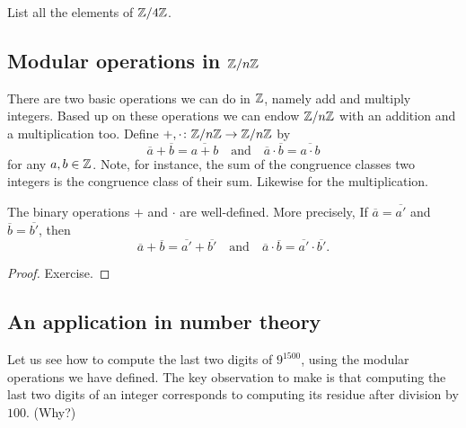 \documentclass[11pt,a4paper]{article}
\begin{document}
\begin{eje}
    List all the elements of \(\mathbb{Z}/ 4 \mathbb{Z}\).
\end{eje}


\subsection[]{Modular operations in \(\mathbb{Z}/ n \mathbb{Z}\)}

There are two basic operations we can do in \(\mathbb{Z}\), namely add and multiply integers.
Based up on these operations we can endow \(\mathbb{Z}/n \mathbb{Z}\) with an addition and a multiplication too.
Define \(+,\cdot\colon \mathbb{Z}/n\mathbb{Z} \to \mathbb{Z}/n\mathbb{Z}\) by 
\[\overline{a} + \overline{b} = \overline{a+b}
 \quad \text{and}\quad \overline{a} \cdot \overline{b} = \overline{a\cdot b}\]
for any \(a,b\in \mathbb{Z}\).
Note, for instance, the sum of the congruence classes two integers is  the congruence class of their sum.
Likewise for the multiplication.


\begin{teo}
    The binary operations \(+\) and \(\cdot\) are well-defined.
    More precisely,
    If \(\overline{a}=\overline{a'}\) and \(\overline{b}=\overline{b'}\), then 
    \[\overline{a} + \overline{b} = \overline{a'} + \overline{b'}\quad\text{and}\quad \overline{a} \cdot \overline{b} = \overline{a'} \cdot \overline{b'}.\]

\end{teo}

\begin{proof}
    Exercise.
\end{proof}


\subsection{An application in number theory}

Let us see how to compute the last two digits of \(9^{1500}\), using the modular operations we have defined.
The key observation to make is that computing the last two digits of an integer corresponds to computing its residue   after division by \(100\).
(Why?)
\end{document}
